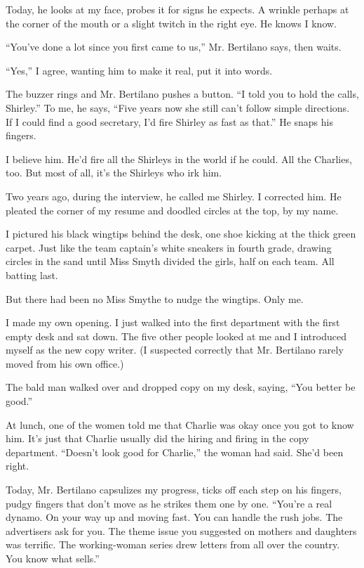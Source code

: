 \documentclass[
]{article}
\begin{document}
Today, he looks at my face, probes it for signs he expects. A wrinkle
perhaps at the corner of the mouth or a slight twitch in the right eye.
He knows I know.

``You've done a lot since you first came to us,'' Mr. Bertilano says,
then waits.

``Yes,'' I agree, wanting him to make it real, put it into words.

The buzzer rings and Mr. Bertilano pushes a button. ``I told you to hold
the calls, Shirley.'' To me, he says, ``Five years now she still can't
follow simple directions. If I could find a good secretary, I'd fire
Shirley as fast as that.'' He snaps his fingers.

I believe him. He'd fire all the Shirleys in the world if he could. All
the Charlies, too. But most of all, it's the Shirleys who irk him.

Two years ago, during the interview, he called me Shirley. I corrected
him. He pleated the corner of my resume and doodled circles at the top,
by my name.

I pictured his black wingtips behind the desk, one shoe kicking at the
thick green carpet. Just like the team captain's white sneakers in
fourth grade, drawing circles in the sand until Miss Smyth divided the
girls, half on each team. All batting last.

But there had been no Miss Smythe to nudge the wingtips. Only me.

I made my own opening. I just walked into the first department with the
first empty desk and sat down. The five other people looked at me and I
introduced myself as the new copy writer. (I sus­pected correctly that
Mr. Bertilano rarely moved from his own office.)

The bald man walked over and dropped copy on my desk, saying, ``You
better be good.''

At lunch, one of the women told me that Charlie was okay once you got to
know him. It's just that Charlie usually did the hiring and firing in
the copy department. ``Doesn't look good for Charlie,'' the woman had
said. She'd been right.

Today, Mr. Bertilano capsulizes my progress, ticks off each step on his
fingers, pudgy fingers that don't move as he strikes them one by one.
``You're a real dynamo. On your way up and moving fast. You can handle
the rush jobs. The advertisers ask for you. The theme issue you
suggested on mothers and daughters was terrific. The working-woman
series drew letters from all over the country. You know what sells.''
\end{document}
